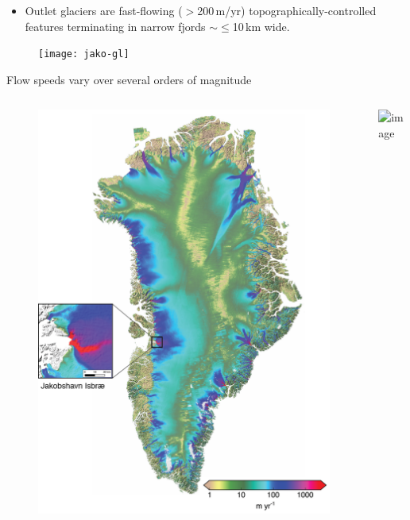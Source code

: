 \documentclass[hide notes,intlimits]{beamer}
\begin{document}
\begin{frame}[plain]
    \begin{itemize}
    \item Outlet glaciers are fast-flowing ($>$200\,m/yr) topographically-controlled features terminating in narrow fjords $\sim\le$10\,km wide.
    \end{itemize}
    \begin{figure}
      \texttt{[image: jako-gl]}
  \end{figure}
\end{frame}

{
%
} 

\begin{frame}{Flow speeds vary over several orders of magnitude}
\vspace{-0.74em}
  \begin{columns}
    \column[c]{5cm}
    \begin{figure}
      \includegraphics[width=\textwidth]{greenland-obs-overview}
    \end{figure}
    \column[c]{5cm}
    \includegraphics<1>[width=\textwidth]{jakobshavn-obs-nogate}
  \end{columns}
\end{frame}
\end{document}
